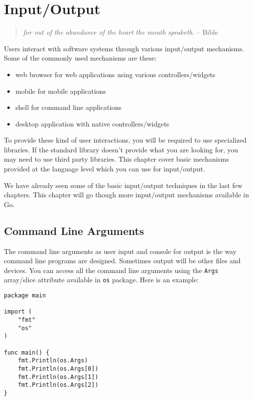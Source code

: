 \cleardoublepage
{}
\chapter{Input/Output}

\begin{quote}
\textit{for out of the abundance of the heart the mouth speaketh.} -- Bible
\end{quote}

Users interact with software systems through various input/output
 mechanisms.  Some of the commonly used mechanisms are these:

\begin{itemize}
  \item web browser for web applications using various controllers/widgets
  \item mobile for mobile applications
  \item shell for command line applications
  \item desktop application with native controllers/widgets
\end{itemize}

To provide these kind of user interactions, you will be required to use
specialized libraries. If the standard library doesn't provide what you are
looking for, you may need to use third party libraries. This chapter cover basic
mechanisms provided at the language level which you can use for input/output.

We have already seen some of the basic input/output techniques in the last few
chapters. This chapter will go though more input/output mechanisms available in
Go.

\section{Command Line Arguments}

The command line arguments as user input and
console for output is the way command line programs are designed.
Sometimes output will be other files and devices.  You can access all
the command line arguments using the \texttt{Args} array/slice
attribute available in \texttt{os} package.  Here is an example:

\begin{lstlisting}[numbers=none]
package main

import (
    "fmt"
    "os"
)

func main() {
    fmt.Println(os.Args)
    fmt.Println(os.Args[0])
    fmt.Println(os.Args[1])
    fmt.Println(os.Args[2])
}
\end{lstlisting}

